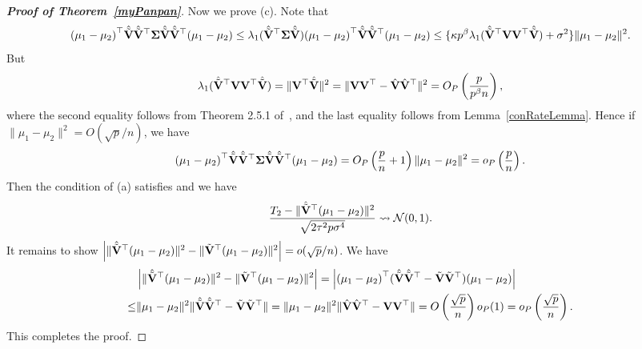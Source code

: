\documentclass[times,sort&compress,3p]{elsarticle}
\theoremstyle{plain}
\theoremstyle{definition}
\theoremstyle{remark}
\begin{document}
\begin{appendices}
\begin{proof}[\textbf{Proof of Theorem~\ref{myPanpan}}]
Now we prove (c).
    Note that
    \begin{equation*}
             {(\mu_1-\mu_2)}^\top  \hat{\tilde{\mathbf{V}}}\hat{\tilde{\mathbf{V}}}^\top \boldsymbol{\Sigma} \hat{\tilde{\mathbf{V}}}\hat{\tilde{\mathbf{V}}}^\top (\mu_1-\mu_2)
            \leq 
            \lambda_1(\hat{\tilde{\mathbf{V}}}^\top \boldsymbol{\Sigma} \hat{\tilde{\mathbf{V}}}) {(\mu_1-\mu_2)}^\top  \hat{\tilde{\mathbf{V}}}\hat{\tilde{\mathbf{V}}}^\top (\mu_1-\mu_2)
            \leq  
            \{\kappa p^{\beta}\lambda_1(\hat{\tilde{\mathbf{V}}}^\top  \mathbf{V}\mathbf{V}^\top   \hat{\tilde{\mathbf{V}}})+\sigma^2\}
             \|\mu_1-\mu_2\|^2.
    \end{equation*}
    But
    \begin{equation*}
\lambda_1(\hat{\tilde{\mathbf{V}}}^\top  \mathbf{V}\mathbf{V}^\top   \hat{\tilde{\mathbf{V}}})
=\|\mathbf{V}^\top   \hat{\tilde{\mathbf{V}}}\|^2
            = \|\mathbf{V}\mathbf{V}^\top -\hat{\mathbf{V}}\hat{\mathbf{V}}^\top \|^2=O_P\left(\frac{p}{p^{\beta}n}\right),
    \end{equation*}
    where the second equality follows from Theorem 2.5.1 of~\cite{matrixComputations}, and the last equality follows from Lemma~\ref{conRateLemma}. 
Hence if $\|\mu_1-\mu_2\|^2=O(\sqrt{p}/n)$, we have
$$
             {(\mu_1-\mu_2)}^\top  \hat{\tilde{\mathbf{V}}}\hat{\tilde{\mathbf{V}}}^\top \boldsymbol{\Sigma} \hat{\tilde{\mathbf{V}}}\hat{\tilde{\mathbf{V}}}^\top (\mu_1-\mu_2)
             =O_P\left(\frac{p}{n}+1\right)\|\mu_1-\mu_2\|^2
             =o_P\left(\frac{p}{n}\right).
$$
Then the condition of (a) satisfies and we have
$$
\frac{T_2-\|\hat{\tilde{\mathbf{V}}}^\top  (\mu_1-\mu_2)\|^2}{\sqrt{2\tau^2 p \sigma^4}}
\rightsquigarrow \mathcal{N}(0,1).
$$
It remains to show
$
\left|\|\hat{\tilde{\mathbf{V}}}^\top  (\mu_1-\mu_2)\|^2
-\|\tilde{\mathbf{V}}^\top  (\mu_1-\mu_2)\|^2\right|
=o(\sqrt{p}/n)
$.
    We have
\begin{align*}
    &\left|\|\hat{\tilde{\mathbf{V}}}^\top  (\mu_1-\mu_2)\|^2-\|\tilde{\mathbf{V}}^\top  (\mu_1-\mu_2)\|^2\right|=
    \left|{(\mu_1-\mu_2)}^\top (\hat{\tilde{\mathbf{V}}}\hat{\tilde{\mathbf{V}}}^\top -\tilde{\mathbf{V}}\tilde{\mathbf{V}}^\top )(\mu_1-\mu_2)\right|\\
    \leq &
    \|\mu_1-\mu_2\|^2 \|\hat{\tilde{\mathbf{V}}}\hat{\tilde{\mathbf{V}}}^\top -\tilde{\mathbf{V}}\tilde{\mathbf{V}}^\top \|
    = 
    \|\mu_1-\mu_2\|^2  \|\hat{\mathbf{V}}\hat{\mathbf{V}}^\top -\mathbf{V}\mathbf{V}^\top \|
    =O\left(\frac{\sqrt{p}}{n}\right)o_P(1)=o_P\left(\frac{\sqrt{p}}{n}\right).
\end{align*}
This completes the proof.
\end{proof}


\end{appendices}
\end{document}
